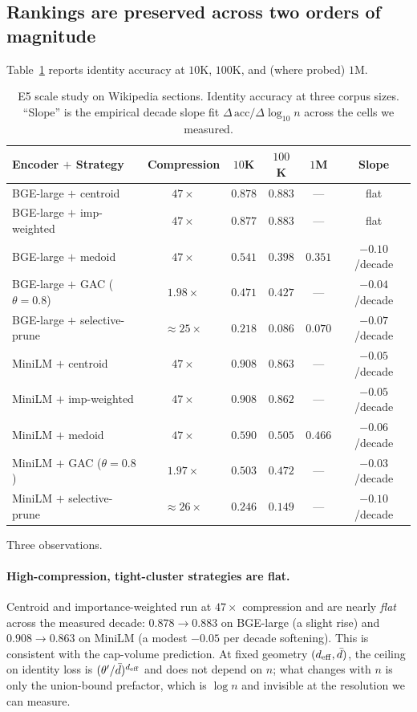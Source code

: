 \subsection{Rankings are preserved across two orders of magnitude}
\label{sec:e5:rankings}

Table~\ref{tab:e5-rankings} reports identity accuracy at $10$K, $100$K,
and (where probed) $1$M.

\begin{table}[h]
\centering
\small
\begin{tabular}{lccccc}
\toprule
Encoder $+$ Strategy & Compression & $10$K & $100$K & $1$M & Slope \\
\midrule
BGE-large $+$ centroid         & $47\times$ & $0.878$ & $0.883$ & --- & flat \\
BGE-large $+$ imp-weighted    & $47\times$ & $0.877$ & $0.883$ & --- & flat \\
BGE-large $+$ medoid          & $47\times$ & $0.541$ & $0.398$ & $0.351$ & $-0.10$/decade \\
BGE-large $+$ GAC ($\theta{=}0.8$) & $1.98\times$ & $0.471$ & $0.427$ & --- & $-0.04$/decade \\
BGE-large $+$ selective-prune  & $\approx 25\times$ & $0.218$ & $0.086$ & $0.070$ & $-0.07$/decade \\
\midrule
MiniLM $+$ centroid           & $47\times$ & $0.908$ & $0.863$ & --- & $-0.05$/decade \\
MiniLM $+$ imp-weighted       & $47\times$ & $0.908$ & $0.862$ & --- & $-0.05$/decade \\
MiniLM $+$ medoid             & $47\times$ & $0.590$ & $0.505$ & $0.466$ & $-0.06$/decade \\
MiniLM $+$ GAC ($\theta{=}0.8$) & $1.97\times$ & $0.503$ & $0.472$ & --- & $-0.03$/decade \\
MiniLM $+$ selective-prune    & $\approx 26\times$ & $0.246$ & $0.149$ & --- & $-0.10$/decade \\
\bottomrule
\end{tabular}
\caption{E5 scale study on Wikipedia sections. Identity accuracy at
three corpus sizes. ``Slope'' is the empirical decade slope fit
$\Delta\,\mathrm{acc}/\Delta\log_{10} n$ across the cells we
measured.}
\label{tab:e5-rankings}
\end{table}

Three observations.

\paragraph{High-compression, tight-cluster strategies are flat.}
Centroid and importance-weighted run at $47\times$ compression and are
nearly \emph{flat} across the measured decade: $0.878 \to 0.883$ on
BGE-large (a slight rise) and $0.908 \to 0.863$ on MiniLM (a modest
$-0.05$ per decade softening). This is consistent with the
cap-volume prediction. At fixed geometry $({d_{\mathrm{eff}}}, \bar{d})$, the
ceiling on identity loss is $(\theta'/\bar{d})^{{d_{\mathrm{eff}}}}$ and does not
depend on $n$; what changes with $n$ is only the union-bound prefactor,
which is $\log n$ and invisible at the resolution we can measure.

